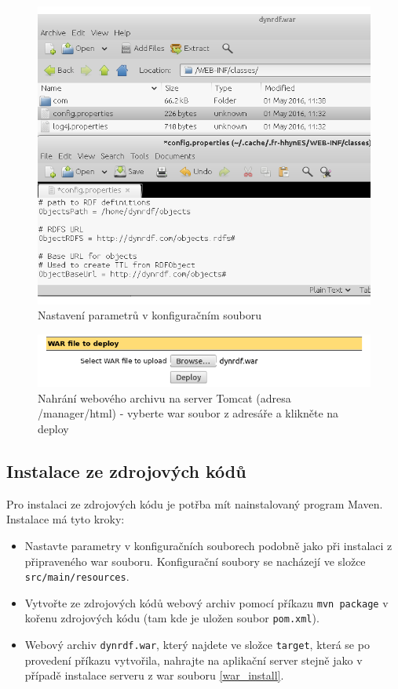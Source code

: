 \documentclass[thesis=B,czech]{FITthesis}[2012/06/26]
\begin{document}
      \begin{figure}\centering
 	\includegraphics[width=\textwidth]{config}
 	\caption[Nastavení parametrů v konfiguračním souboru]{Nastavení parametrů v konfiguračním souboru}\label{config}		
  \end{figure}
  
        \begin{figure}\centering
 	\includegraphics[width=\textwidth]{tomcat_deploy}
 	\caption[Nahrání webového archivu na server Tomcat]{Nahrání webového archivu na server Tomcat (adresa /manager/html) - vyberte war soubor z adresáře a klikněte na deploy}\label{tomcat_deploy}		
  \end{figure}
  

  
  \subsection{Instalace ze zdrojových kódů}
  Pro instalaci ze zdrojových kódu je potřba mít nainstalovaný program Maven.
  Instalace má tyto kroky:
   \begin{itemize}
   \item Nastavte parametry v konfiguračních souborech podobně jako při instalaci z připraveného war souboru. Konfigurační soubory se
   nacházejí ve složce \texttt{src/main/resources}.
   \item Vytvořte ze zdrojových kódů webový archiv pomocí příkazu \texttt{mvn package} v kořenu zdrojových kódu (tam kde je uložen soubor \texttt{pom.xml}).
   \item Webový archiv \texttt{dynrdf.war}, který najdete ve složce \texttt{target}, která se po provedení příkazu vytvořila, nahrajte na aplikační server stejně jako 
   v případě instalace serveru z war souboru \ref{war_install}.

  \end{itemize}
  
\end{document}
